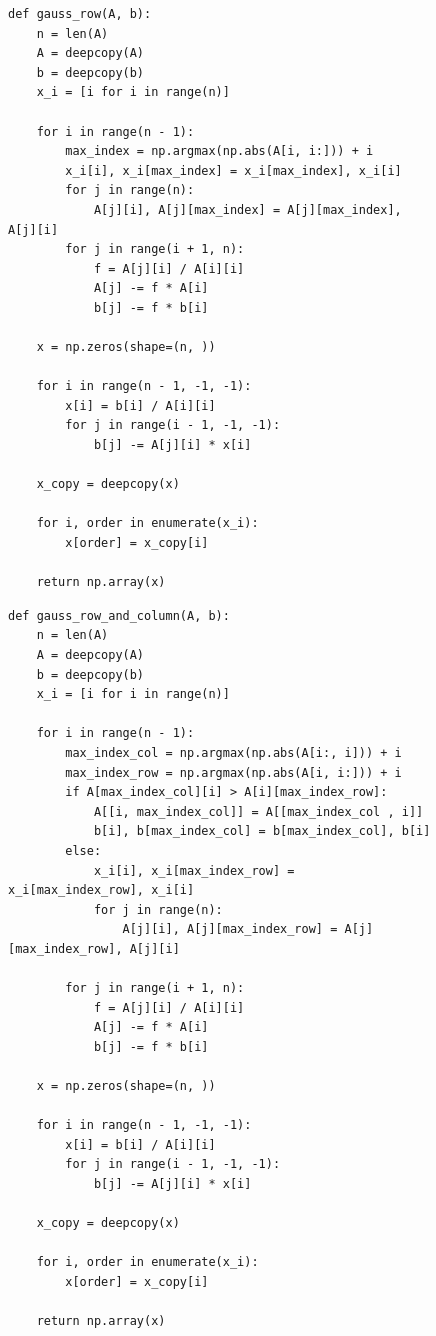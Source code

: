 \documentclass[a4paper, 14pt]{extarticle}
\begin{document}
\begin{figure}[H]
\begin{lstlisting}[language={},caption={Метод Гаусса с выбором главного элемента по строке},label={lst:code2}]
def gauss_row(A, b):
    n = len(A)
    A = deepcopy(A)
    b = deepcopy(b)
    x_i = [i for i in range(n)]

    for i in range(n - 1):
        max_index = np.argmax(np.abs(A[i, i:])) + i
        x_i[i], x_i[max_index] = x_i[max_index], x_i[i]
        for j in range(n):
            A[j][i], A[j][max_index] = A[j][max_index], A[j][i]
        for j in range(i + 1, n):
            f = A[j][i] / A[i][i]
            A[j] -= f * A[i]
            b[j] -= f * b[i]

    x = np.zeros(shape=(n, ))

    for i in range(n - 1, -1, -1):
        x[i] = b[i] / A[i][i]
        for j in range(i - 1, -1, -1):
            b[j] -= A[j][i] * x[i]

    x_copy = deepcopy(x)

    for i, order in enumerate(x_i):
        x[order] = x_copy[i]

    return np.array(x)
\end{lstlisting}
\end{figure}

\begin{figure}[H]
\begin{lstlisting}[language={},caption={Метод Гаусса с выбором главного элемента по столбцу и по строке},label={lst:code3}]
def gauss_row_and_column(A, b):
    n = len(A)
    A = deepcopy(A)
    b = deepcopy(b)
    x_i = [i for i in range(n)]

    for i in range(n - 1):
        max_index_col = np.argmax(np.abs(A[i:, i])) + i
        max_index_row = np.argmax(np.abs(A[i, i:])) + i
        if A[max_index_col][i] > A[i][max_index_row]:
            A[[i, max_index_col]] = A[[max_index_col , i]]
            b[i], b[max_index_col] = b[max_index_col], b[i]
        else:
            x_i[i], x_i[max_index_row] = x_i[max_index_row], x_i[i]
            for j in range(n):
                A[j][i], A[j][max_index_row] = A[j][max_index_row], A[j][i]

        for j in range(i + 1, n):
            f = A[j][i] / A[i][i]
            A[j] -= f * A[i]
            b[j] -= f * b[i]

    x = np.zeros(shape=(n, ))

    for i in range(n - 1, -1, -1):
        x[i] = b[i] / A[i][i]
        for j in range(i - 1, -1, -1):
            b[j] -= A[j][i] * x[i]

    x_copy = deepcopy(x)

    for i, order in enumerate(x_i):
        x[order] = x_copy[i]

    return np.array(x)
\end{lstlisting}
\end{figure}
\end{document}
